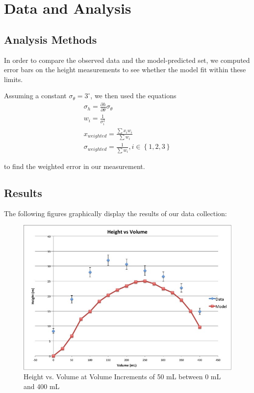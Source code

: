 \documentclass[12pt]{article}
\begin{document}
  \section{Data and Analysis}
  \subsection{Analysis Methods}
  In order to compare the observed data and the model-predicted set, we computed error bars on the height measurements to see whether the model fit within these limits. 
  
  Assuming a constant $\sigma_{\theta} = 3^{\circ}$, we then used the equations
  \begin{align}
  \sigma_{h} = \frac{\partial h}{\partial \theta}\sigma_{\theta} \\
  w_{i} = \frac{1}{\sigma_{i}^{2}} \\
  x_{weighted} = \frac{\sum x_{i}w_{i}}{\sum w_{i}} \\
  \sigma_{weighted} = \frac{1}{\sum w_{i}}, i  \in \left\{1,2,3\right\}
  \end{align}
  
  to find the weighted error in our measurement.
  \subsection{Results}
The following figures graphically display the results of our data collection:

\begin{figure}[H]
\includegraphics[scale=.5]{increment50mL.jpg}
\centering
\caption{Height vs. Volume at Volume Increments of 50 mL between 0 mL and 400 mL}
\end{figure}
    
\end{document}
